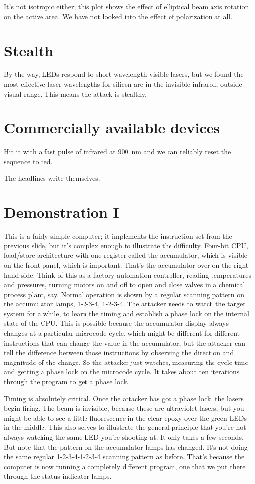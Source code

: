\documentclass[letterpaper]{article}
\begin{document}
It's not isotropic either; this plot shows the effect of elliptical beam axis
rotation on the active area. We have not looked into the effect of polarization
at all.
\section{Stealth}
By the way, LEDs respond to short wavelength visible lasers, but we found the
most effective laser wavelengths for silicon are in the invisible infrared,
outside visual range. This means the attack is stealthy.
\section{Commercially available devices}
Hit it with a fast pulse of infrared at \SI{900}{\nano\metre} and we can
reliably reset the sequence to red.

The headlines write themselves.
\section{Demonstration I}
This is a fairly simple computer; it implements the instruction set from the
previous slide, but it's complex enough to illustrate the difficulty. Four-bit
CPU, load/store architecture with one register called the accumulator, which is
visible on the front panel, which is important. That's the accumulator over on
the right hand side. Think of this as a factory automation controller, reading
temperatures and pressures, turning motors on and off to open and close valves
in a chemical process plant, say. Normal operation is shown by a regular
scanning pattern on the accumulator lamps, 1-2-3-4, 1-2-3-4. The attacker needs
to watch the target system for a while, to learn the timing and establish a
phase lock on the internal state of the CPU. This is possible because the
accumulator display always changes at a particular microcode cycle, which might
be different for different instructions that can change the value in the
accumulator, but the attacker can tell the difference between those
instructions by observing the direction and magnitude of the change. So the
attacker just watches, measuring the cycle time and getting a phase lock on the
microcode cycle. It takes about ten iterations through the program to get a
phase lock.

Timing is absolutely critical. Once the attacker has got a phase lock, the
lasers begin firing. The beam is invisible, because these are ultraviolet
lasers, but you might be able to see a little fluorescence in the clear epoxy
over the green LEDs in the middle. This also serves to illustrate the general
principle that you're not always watching the same LED you're shooting at. It
only takes a few seconds. But note that the pattern on the accumulator lamps
has changed. It's not doing the same regular 1-2-3-4-1-2-3-4 scanning pattern
as before. That's because the computer is now running a completely different
program, one that we put there through the status indicator lamps.
\end{document}
